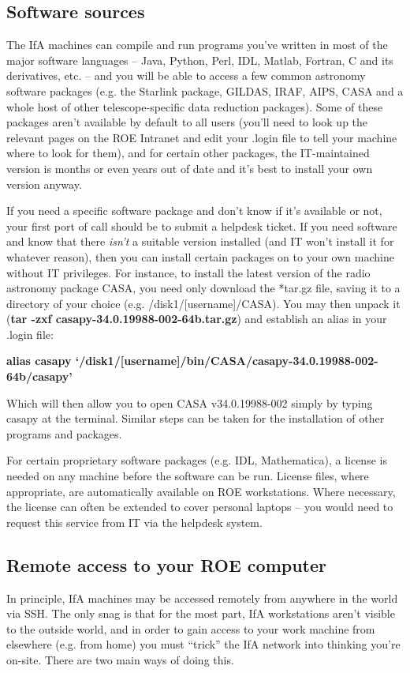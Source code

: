 \subsection{Software sources}
The IfA machines can compile and run programs you've written in most of the major software languages -- Java, Python, Perl, IDL, Matlab, Fortran, C and its derivatives, etc. -- and you will be able to access a few common astronomy software packages (e.g. the Starlink package, GILDAS, IRAF, AIPS, CASA and a whole host of other telescope-specific data reduction packages). Some of these packages aren't available by default to all users (you'll need to look up the relevant pages on the ROE Intranet and edit your .login file to tell your machine where to look for them), and for certain other packages, the IT-maintained version is months or even years out of date and it's best to install your own version anyway. 

If you need a specific software package and don't know if it's available or not, your first port of call should be to submit a helpdesk ticket. If you need software and know that there \textit{isn't} a suitable version installed (and IT won't install it for whatever reason), then you can install certain packages on to your own machine without IT privileges. For instance, to install the latest version of the radio astronomy package CASA, you need only download the *tar.gz file, saving it to a directory of your choice (e.g. /disk1/[username]/CASA). You may then unpack it ({\bf tar -zxf casapy-34.0.19988-002-64b.tar.gz}) and establish an alias in your .login file:

{\bf alias casapy `/disk1/[username]/bin/CASA/casapy-34.0.19988-002-64b/casapy'}

Which will then allow you to open CASA v34.0.19988-002 simply by typing {\sc casapy} at the terminal. Similar steps can be taken for the installation of other programs and packages.

For certain proprietary software packages (e.g. IDL, Mathematica), a license is needed on any machine before the software can be run. License files, where appropriate, are automatically available on ROE workstations. Where necessary, the license can often be extended to cover personal laptops -- you would need to request this service from IT via the helpdesk system.

\subsection{Remote access to your ROE computer}
In principle, IfA machines may be accessed remotely from anywhere in the world via SSH. The only snag is that for the most part, IfA workstations aren't visible to the outside world, and in order to gain access to your work machine from elsewhere (e.g. from home) you must ``trick'' the IfA network into thinking you're on-site. There are two main ways of doing this.

